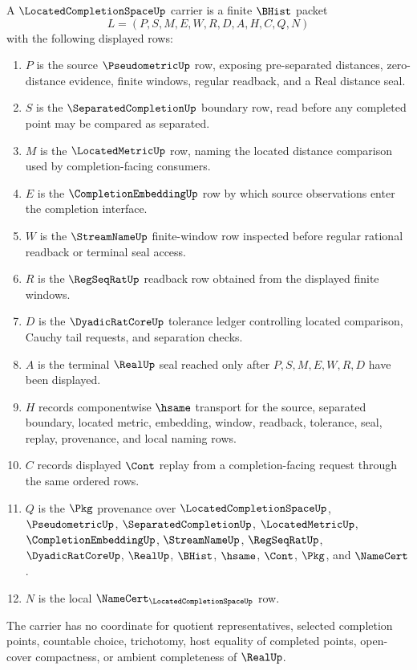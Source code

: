 \begin{definition}
\label{def:located-completion-space-carrier}
A $\LocatedCompletionSpaceUp$ carrier is a finite $\BHist$ packet
$$
L=(P,S,M,E,W,R,D,A,H,C,Q,N)
$$
with the following displayed rows:
\begin{enumerate}
\item $P$ is the source $\PseudometricUp$ row, exposing pre-separated distances, zero-distance evidence, finite windows, regular readback, and a Real distance seal.
\item $S$ is the $\SeparatedCompletionUp$ boundary row, read before any completed point may be compared as separated.
\item $M$ is the $\LocatedMetricUp$ row, naming the located distance comparison used by completion-facing consumers.
\item $E$ is the $\CompletionEmbeddingUp$ row by which source observations enter the completion interface.
\item $W$ is the $\StreamNameUp$ finite-window row inspected before regular rational readback or terminal seal access.
\item $R$ is the $\RegSeqRatUp$ readback row obtained from the displayed finite windows.
\item $D$ is the $\DyadicRatCoreUp$ tolerance ledger controlling located comparison, Cauchy tail requests, and separation checks.
\item $A$ is the terminal $\RealUp$ seal reached only after $P,S,M,E,W,R,D$ have been displayed.
\item $H$ records componentwise $\hsame$ transport for the source, separated boundary, located metric, embedding, window, readback, tolerance, seal, replay, provenance, and local naming rows.
\item $C$ records displayed $\Cont$ replay from a completion-facing request through the same ordered rows.
\item $Q$ is the $\Pkg$ provenance over $\LocatedCompletionSpaceUp$, $\PseudometricUp$, $\SeparatedCompletionUp$, $\LocatedMetricUp$, $\CompletionEmbeddingUp$, $\StreamNameUp$, $\RegSeqRatUp$, $\DyadicRatCoreUp$, $\RealUp$, $\BHist$, $\hsame$, $\Cont$, $\Pkg$, and $\NameCert$.
\item $N$ is the local $\NameCert_{\LocatedCompletionSpaceUp}$ row.
\end{enumerate}
The carrier has no coordinate for quotient representatives, selected completion points, countable choice, trichotomy, host equality of completed points, open-cover compactness, or ambient completeness of $\RealUp$.
\end{definition}

